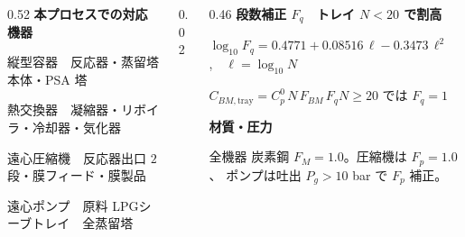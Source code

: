 \begin{frame}[t]
  \begin{columns}[T,onlytextwidth]
    \begin{column}{0.52\textwidth}
      {\scriptsize\bfseries\color{HeaderBlue} 本プロセスでの対応機器}\par
      \vspace{0.25em}
      {\scriptsize\raggedright\linespread{1.25}\selectfont
       縦型容器　反応器・蒸留塔本体・PSA 塔\\
       \par
       熱交換器　凝縮器・リボイラ・冷却器・気化器\par
       遠心圧縮機　反応器出口 $2$ 段・膜フィード・膜製品\par
       遠心ポンプ　原料 LPG\quad シーブトレイ　全蒸留塔\par}
    \end{column}

    \begin{column}{0.02\textwidth}\end{column}

    \begin{column}{0.46\textwidth}
      {\scriptsize\bfseries\color{HeaderBlue} 段数補正 $F_q$　トレイ $N<20$ で割高}\par
      \vspace{0.2em}
      {\scriptsize $\log_{10}F_q = 0.4771 + 0.08516\,\ell - 0.3473\,\ell^{2}$,\ \ $\ell=\log_{10}\!N$}\par
      \vspace{0.2em}
      {\scriptsize $C_{BM,\mathrm{tray}} = C_p^0\,N\,F_{BM}\,F_q$\quad $N\ge20$ では $F_q=1$}\par

      \vspace{0.55em}
      {\scriptsize\bfseries\color{HeaderBlue} 材質・圧力}\par
      \vspace{0.2em}
      {\scriptsize\raggedright 全機器 炭素鋼 $F_M=1.0$。圧縮機は $F_p=1.0$、
       ポンプは吐出 $P_g>10$ bar で $F_p$ 補正。}\par
    \end{column}
  \end{columns}

\end{frame}
